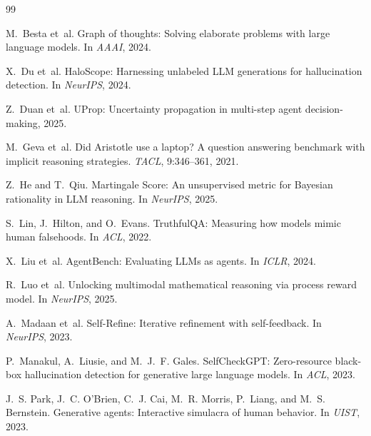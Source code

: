 
\begin{thebibliography}{99}

M.~Besta et~al.
\newblock Graph of thoughts: Solving elaborate problems with large language models.
\newblock In \emph{AAAI}, 2024.

X.~Du et~al.
\newblock HaloScope: Harnessing unlabeled LLM generations for hallucination detection.
\newblock In \emph{NeurIPS}, 2024.

Z.~Duan et~al.
\newblock UProp: Uncertainty propagation in multi-step agent decision-making, 2025.

M.~Geva et~al.
\newblock Did Aristotle use a laptop? A question answering benchmark with implicit reasoning strategies.
\newblock \emph{TACL}, 9:346--361, 2021.

Z.~He and T.~Qiu.
\newblock Martingale Score: An unsupervised metric for Bayesian rationality in LLM reasoning.
\newblock In \emph{NeurIPS}, 2025.

S.~Lin, J.~Hilton, and O.~Evans.
\newblock TruthfulQA: Measuring how models mimic human falsehoods.
\newblock In \emph{ACL}, 2022.

X.~Liu et~al.
\newblock AgentBench: Evaluating LLMs as agents.
\newblock In \emph{ICLR}, 2024.

R.~Luo et~al.
\newblock Unlocking multimodal mathematical reasoning via process reward model.
\newblock In \emph{NeurIPS}, 2025.

A.~Madaan et~al.
\newblock Self-Refine: Iterative refinement with self-feedback.
\newblock In \emph{NeurIPS}, 2023.

P.~Manakul, A.~Liusie, and M.~J.~F. Gales.
\newblock SelfCheckGPT: Zero-resource black-box hallucination detection for generative large language models.
\newblock In \emph{ACL}, 2023.

J.~S. Park, J.~C. O'Brien, C.~J. Cai, M.~R. Morris, P.~Liang, and M.~S. Bernstein.
\newblock Generative agents: Interactive simulacra of human behavior.
\newblock In \emph{UIST}, 2023.


\end{thebibliography}
